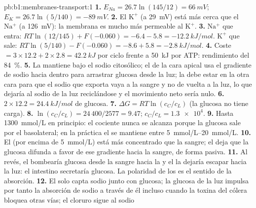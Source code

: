 \begin{solution}{pb:b1:membranes-transport:1}
\textbf{1.} $E_{Na} = 26.7\ln(145/12) = \qty{+66}{mV}$; $E_K =
26.7\ln(5/140) = \qty{-89}{mV}$.
\textbf{2.} El $\mathrm{K^+}$ (a \qty{29}{mV}) está más cerca que el
$\mathrm{Na^+}$ (a \qty{126}{mV}): la membrana es mucho más permeable al
$\mathrm{K^+}$.
\textbf{3.} $\mathrm{Na^+}$ que entra: $RT\ln(12/145) + F(-0.060) = -6.4 -
5.8 = \qty{-12.2}{kJ/mol}$. $\mathrm{K^+}$ que sale: $RT\ln(5/140) -
F(-0.060) = -8.6 + 5.8 = \qty{-2.8}{kJ/mol}$.
\textbf{4.} Coste $= 3\times 12.2 + 2\times 2.8 = \qty{42.2}{kJ}$ por
ciclo frente a \qty{50}{kJ} por ATP: rendimiento del \qty{84}{\%}.
\textbf{5.} La  mantiene bajo el sodio citosólico; el  de la
cara apical usa el gradiente de sodio hacia dentro para arrastrar glucosa
desde la luz; la  debe estar en la otra cara para que el sodio que
exporta vaya a la sangre y no de vuelta a la luz, lo que dejaría al sodio de
la luz reciclándose y el movimiento neto sería nulo.
\textbf{6.} $2\times 12.2 = \qty{24.4}{kJ/mol}$ de glucosa.
\textbf{7.} $\Delta G = RT\ln(c_C/c_L)$ (la glucosa no tiene carga).
\textbf{8.} $\ln(c_C/c_L) = 24\,400/2577 = 9.47$; $c_C/c_L =
\num{1.3e4}$.
\textbf{9.} Hasta \qty{1300}{mmol/L} en principio: el cociente nunca se
alcanza porque la glucosa sale por el  basolateral; en la
práctica el  se mantiene entre \qtyrange{5}{20}{mmol/L}.
\textbf{10.} El  (por encima de \qty{5}{mmol/L}) está más concentrado
que la sangre; el  deja que la glucosa difunda a favor de ese
gradiente hacia la sangre, de forma pasiva.
\textbf{11.} Al revés, el  bombearía glucosa desde la sangre
hacia la  y el  la dejaría escapar hacia la luz: el
intestino secretaría glucosa. La polaridad de los  es el
sentido de la absorción.
\textbf{12.} El  solo capta sodio junto con glucosa; la glucosa
de la luz impulsa por tanto la absorción de sodio a través de él incluso
cuando la toxina del cólera bloquea otras vías; el cloruro sigue al sodio

\end{solution}
